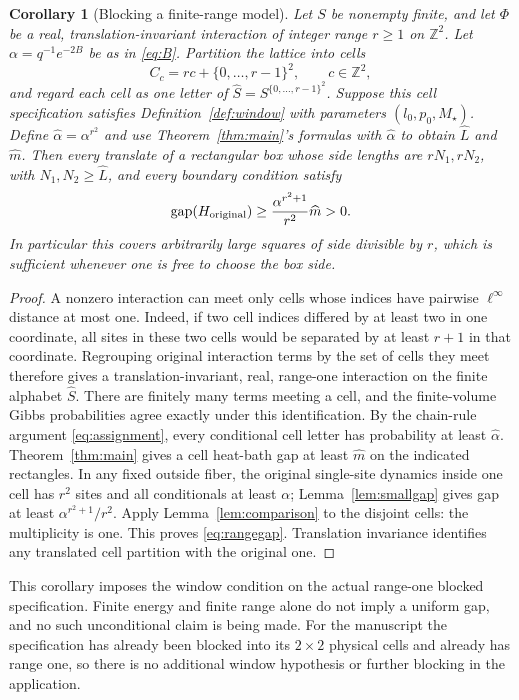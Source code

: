 \documentclass[11pt]{amsart}
\newtheorem{corollary}[theorem]{Corollary}
\theoremstyle{definition}
\newcommand{\Z}{\mathbb Z}
\newcommand{\gap}{\operatorname{gap}}
\newcommand{\1}{\mathbf 1}
\begin{document}
\begin{corollary}[Blocking a finite-range model]
\label{cor:range}
Let $S$ be nonempty finite, and let $\Phi$ be a real,
translation-invariant interaction of integer range $r\ge1$ on $\Z^2$.
Let $\alpha=q^{-1}e^{-2B}$ be as in \eqref{eq:B}.
Partition the lattice into cells
\[
 C_c=rc+\{0,\ldots,r-1\}^2,\qquad c\in\Z^2,
\]
and regard each cell as one letter of $\widehat S=S^{\{0,\ldots,r-1\}^2}$.
Suppose this cell specification satisfies Definition~\ref{def:window}
with parameters $(l_0,p_0,M_\star)$. Define
$\widehat\alpha=\alpha^{r^2}$ and use
Theorem~\ref{thm:main}'s formulas with $\widehat\alpha$ to obtain
$\widehat L$ and $\widehat m$.
Then every translate of a rectangular box whose side lengths are
$rN_1,rN_2$, with $N_1,N_2\ge\widehat L$, and every boundary condition
satisfy
\begin{equation}\label{eq:rangegap}
 \gap(H_{\rm original})\ge
       \frac{\alpha^{r^2+1}}{r^2}\widehat m>0.
\end{equation}
In particular this covers arbitrarily large squares of side divisible by
$r$, which is sufficient whenever one is free to choose the box side.
\end{corollary}
\begin{proof}
A nonzero interaction can meet only cells whose indices have pairwise
$\ell^\infty$ distance at most one. Indeed, if two cell indices differed
by at least two in one coordinate, all sites in these two cells would be
separated by at least $r+1$ in that coordinate. Regrouping original
interaction terms by the set of cells they meet therefore gives a
translation-invariant, real, range-one interaction on the finite alphabet
$\widehat S$. There are finitely many terms meeting a cell, and the
finite-volume Gibbs probabilities agree exactly under this identification.
By the chain-rule argument \eqref{eq:assignment}, every conditional cell
letter has probability at least $\widehat\alpha$.
Theorem~\ref{thm:main} gives a cell heat-bath gap at least
$\widehat m$ on the indicated rectangles. In any fixed outside fiber, the
original single-site dynamics inside one cell has $r^2$ sites and all
conditionals at least $\alpha$; Lemma~\ref{lem:smallgap} gives gap at
least $\alpha^{r^2+1}/r^2$. Apply
Lemma~\ref{lem:comparison} to the disjoint cells: the multiplicity is one.
This proves \eqref{eq:rangegap}. Translation invariance identifies any
translated cell partition with the original one.
\end{proof}

This corollary imposes the window condition on the actual range-one blocked
specification. Finite energy and finite range alone do not imply a
uniform gap, and no such unconditional claim is being made. For the
manuscript the specification has already been blocked into its $2\times2$
physical cells and already has range one, so there is no additional window
hypothesis or further blocking in the application.
\end{document}
